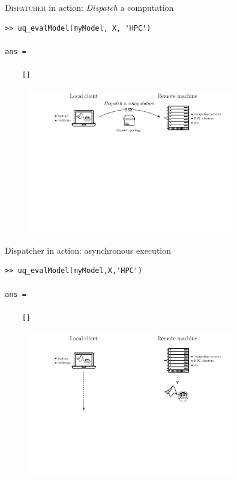 \documentclass[]{rsuqbeamernew}
\begin{document}
\begin{frame}[fragile]{\textsc{Dispatcher} in action: \emph{Dispatch} a computation}

\begin{lstlisting}[basicstyle=\scriptsize,numbers=none]
>> uq_evalModel(myModel, X, 'HPC')
  
ans =
  
    []
\end{lstlisting}
  
\begin{figure}[htbp]    
  \centering
  \includegraphics[width= 0.8\textwidth]{./figures/dispatch-and-fetch-dispatch.pdf}
\end{figure}

\end{frame}

\begin{frame}[fragile]{Dispatcher in action: asynchronous execution}

\begin{lstlisting}[basicstyle=\scriptsize,numbers=none]
>> uq_evalModel(myModel,X,'HPC')
    
ans =

    []
\end{lstlisting}
    
\begin{figure}[htbp]    
  \centering
  \includegraphics[width= 0.8\textwidth]{./figures/dispatch-and-fetch-asynchronous.pdf}
\end{figure}
  
\end{frame}
\end{document}
